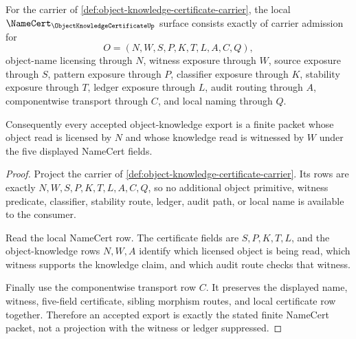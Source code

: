 \begin{theorem}
\label{thm:object-knowledge-certificate-namecert-obligations}
For the carrier of \autoref{def:object-knowledge-certificate-carrier}, the local $\NameCert_{\ObjectKnowledgeCertificateUp}$ surface consists exactly of carrier admission for
$$
O=(N,W,S,P,K,T,L,A,C,Q),
$$
object-name licensing through $N$, witness exposure through $W$, source exposure through $S$, pattern exposure through $P$, classifier exposure through $K$, stability exposure through $T$, ledger exposure through $L$, audit routing through $A$, componentwise transport through $C$, and local naming through $Q$.

Consequently every accepted object-knowledge export is a finite packet whose object read is licensed by $N$ and whose knowledge read is witnessed by $W$ under the five displayed NameCert fields.
\end{theorem}
\begin{proof}
Project the carrier of \autoref{def:object-knowledge-certificate-carrier}. Its rows are exactly $N,W,S,P,K,T,L,A,C,Q$, so no additional object primitive, witness predicate, classifier, stability route, ledger, audit path, or local name is available to the consumer.

Read the local NameCert row. The certificate fields are $S,P,K,T,L$, and the object-knowledge rows $N,W,A$ identify which licensed object is being read, which witness supports the knowledge claim, and which audit route checks that witness.

Finally use the componentwise transport row $C$. It preserves the displayed name, witness, five-field certificate, sibling morphism routes, and local certificate row together. Therefore an accepted export is exactly the stated finite NameCert packet, not a projection with the witness or ledger suppressed.
\end{proof}

